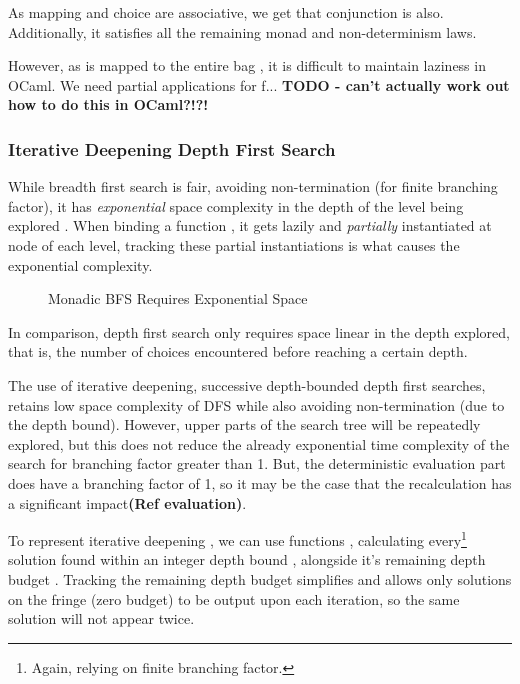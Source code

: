 As mapping and choice are associative, we get that conjunction is also. Additionally, it satisfies all the remaining monad and non-determinism laws. 

However, as  is mapped to the entire bag , it is difficult to maintain laziness in OCaml. We need partial applications for f... \textbf{TODO - can't actually work out how to do this in OCaml?!?!}

\subsubsection{Iterative Deepening Depth First Search}
While breadth first search is fair, avoiding non-termination (for finite branching factor), it has \textit{exponential} space complexity in the depth of the level being explored \cite{NorvigAI}. When binding a function , it gets lazily and \textit{partially} instantiated at node of each level, tracking these partial instantiations is what causes the exponential complexity.

\begin{figure}

\caption{Monadic BFS Requires Exponential Space}
\end{figure}

In comparison, depth first search only requires space linear in the depth explored, that is, the number of choices encountered before reaching a certain depth.

The use of iterative deepening, successive depth-bounded depth first searches, retains low space complexity of DFS while also avoiding non-termination (due to the depth bound). However, upper parts of the search tree will be repeatedly explored, but this does not reduce the already exponential time complexity of the search for branching factor greater than 1. But, the deterministic evaluation part does have a branching factor of 1, so it may be the case that the recalculation has a significant impact\textbf{(Ref evaluation)}. 

To represent iterative deepening \cite{SearchAlgebra}, we can use functions , calculating every\footnote{Again, relying on finite branching factor.} solution found within an integer depth bound , alongside it's remaining depth budget . Tracking the remaining depth budget simplifies  and allows only solutions on the fringe (zero budget) to be output upon each iteration, so the same solution will not appear twice.

